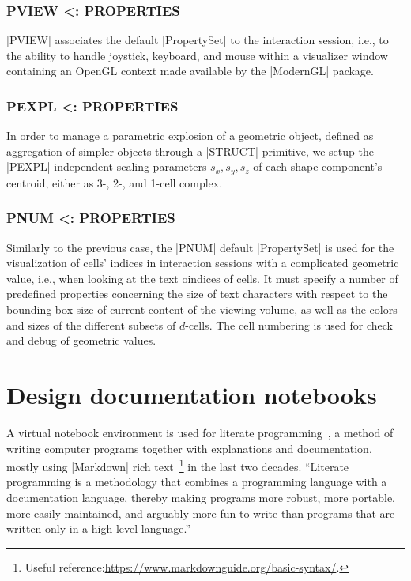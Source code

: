 \begin{coding}
\subsubsection*{\small\sf PVIEW <: PROPERTIES}\label{4-4-3-2}

|PVIEW| associates the default |PropertySet| to the interaction session, i.e., to the ability to handle joystick, keyboard, and mouse within a visualizer window containing an OpenGL context made available by the |ModernGL| package.


\subsubsection*{\small\sf PEXPL <: PROPERTIES}\label{4-4-3-3}

In order to manage a parametric explosion of a geometric object, defined as aggregation of simpler objects through a |STRUCT| primitive, we setup the |PEXPL| independent scaling parameters $s_x, s_y, s_z$ of each shape component’s centroid, either as 3-,  2-, and 1-cell complex. 



\subsubsection*{\small\sf PNUM <: PROPERTIES}\label{4-4-3-4}

Similarly to the previous case, the 
|PNUM| default |PropertySet| is used for the visualization of cells’ indices in  interaction sessions with a complicated geometric value, i.e., when looking at the text oindices of cells. It must specify a number of predefined properties concerning the size of text characters with respect to the bounding box size of current content of the viewing volume, as well as the colors and sizes of the different subsets of $d$-cells. 
The cell numbering is used for check and debug of geometric values. 


\section{Design documentation notebooks}\label{sect:4-5}

A virtual notebook environment is used for literate programming~\cite{10.1093.27.2.97}, a method of writing computer programs together with explanations and documentation, mostly using |Markdown| rich text~\footnote{Useful reference:\href{https://www.markdownguide.org/basic-syntax/}{https://www.markdownguide.org/basic-syntax/}.} in the last two decades. “Literate programming is a methodology that combines a programming language with a documentation language, thereby making programs more robust, more portable, more easily maintained, and arguably more fun to write than programs that are written only in a high-level language.”~\cite{Knuth:92}



\end{coding}
